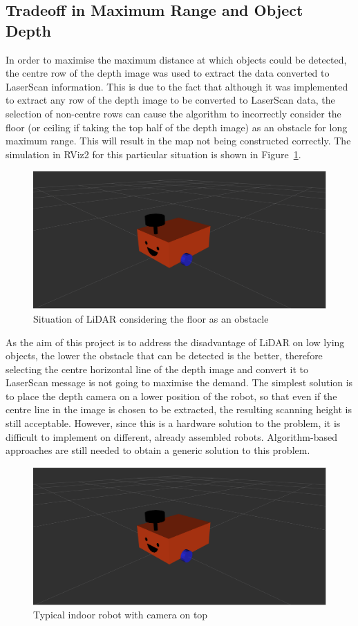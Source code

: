 \subsection{Tradeoff in Maximum Range and Object Depth}
\label{subsec:tradeoff}
In order to maximise the maximum distance at which objects could be detected, 
the centre row of the depth image was used to extract the data converted to LaserScan information. 
This is due to the fact that although it was implemented to extract any row of the depth image to be converted to LaserScan data, 
the selection of non-centre rows can cause the algorithm to incorrectly consider the floor (or ceiling if taking the top half of the depth image) 
as an obstacle for long maximum range. This will result in the map not being constructed correctly. 
The simulation in RViz2 for this particular situation is shown in Figure~\ref{fig:floor_obstacle}.
\begin{figure}[H]
    \centering
    \includegraphics[width=0.8\linewidth]{figs/robot.png}
    \caption{Situation of LiDAR considering the floor as an obstacle}
    \label{fig:floor_obstacle}
\end{figure}
As the aim of this project is to address the disadvantage of LiDAR on low lying objects, 
the lower the obstacle that can be detected is the better, 
therefore selecting the centre horizontal line of the depth image 
and convert it to LaserScan message is not going to maximise the demand. 
The simplest solution is to place the depth camera on a lower position of the robot, 
so that even if the centre line in the image is chosen to be extracted, 
the resulting scanning height is still acceptable. 
However, since this is a hardware solution to the problem, 
it is difficult to implement on different, already assembled robots. 
Algorithm-based approaches are still needed to obtain a generic solution to this problem. 

\begin{figure}[H]
    \centering
    \includegraphics[width=0.8\linewidth]{figs/robot.png}
    \caption{Typical indoor robot with camera on top}
\end{figure}

